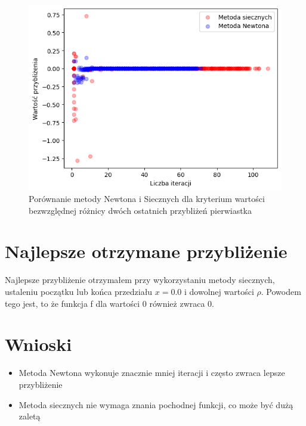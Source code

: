 \documentclass{article}
\begin{document}
\begin{figure}[H]
  \centering
  \begin{minipage}[b]{\textwidth}
    \includegraphics[width=\textwidth]{img26.png}
  \end{minipage}
  \caption{Porównanie metody Newtona i Siecznych dla kryterium wartości bezwzględnej różnicy dwóch ostatnich przybliżeń pierwiastka}
\end{figure}

\section{Najlepsze otrzymane przybliżenie}

Najlepsze przybliżenie otrzymałem przy wykorzystaniu metody siecznych, ustaleniu początku lub końca przedziału \(x = 0.0\) i dowolnej wartości \(\rho\). Powodem tego jest, to że funkcja f dla wartości 0 również zwraca 0.

\section{Wnioski}

\begin{itemize}
    \item Metoda Newtona wykonuje znacznie mniej iteracji i często zwraca lepsze przybliżenie
    \item Metoda siecznych nie wymaga znania pochodnej funkcji, co może być dużą zaletą
\end{itemize}
\end{document}
